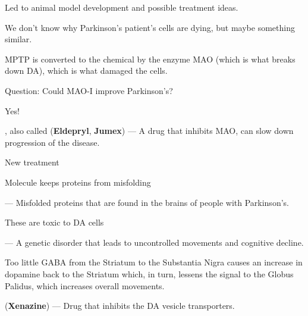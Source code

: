 \begin{coloredlist}
\begin{coloredlist}
\begin{coloredlist}
\begin{coloredlist}
\begin{coloredlist}
\begin{coloredlist}
\begin{coloredlist}
                            \item Led to animal model development and possible treatment ideas.
                        \end{coloredlist}
                    \end{coloredlist}
                \end{coloredlist}
                \item We don't know why Parkinson's patient's cells are dying, but maybe something similar.
                \item MPTP is converted to the chemical  by the enzyme MAO (which is what breaks down DA), which is what damaged the cells.
                \begin{coloredlist}
                    \item Question: Could MAO-I improve Parkinson's?
                    \item Yes!
                    \item {}, also called  (\textbf{Eldepryl}, \textbf{Jumex}) — A drug that inhibits MAO, can slow down progression of the disease.
                \end{coloredlist}
            \end{coloredlist}        
        \end{coloredlist}
        \item New treatment
        \begin{coloredlist}
            \item Molecule keeps proteins from misfolding
            \item {} — Misfolded proteins that are found in the brains of people with Parkinson's.
            \begin{coloredlist}
                \item These are toxic to DA cells
            \end{coloredlist}
        \end{coloredlist}
        \item {} — A genetic disorder that leads to uncontrolled movements and cognitive decline.
        \begin{coloredlist}
            \item Too little GABA from the Striatum to the Substantia Nigra causes an increase in dopamine back to the Striatum which, in turn, lessens the signal to the Globus Palidus, which increases overall movements.
            \item {} (\textbf{Xenazine}) — Drug that inhibits the DA vesicle transporters.

\end{coloredlist}
\end{coloredlist}
\end{coloredlist}
